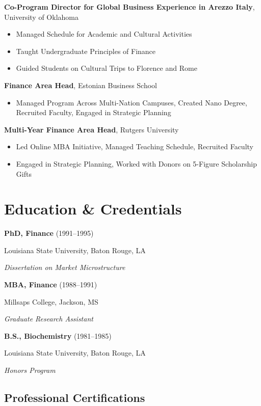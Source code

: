 \documentclass[11pt,a4paper,]{awesome-cv}
\let\oldtextbf\textbf
\renewcommand{\textbf}[1]{\oldtextbf{#1}\vspace{-1mm}}
\begin{document}
\textbf{Co-Program Director for Global Business Experience in Arezzo Italy},
University of Oklahoma

\begin{itemize}
\item Managed Schedule for Academic and Cultural Activities
\item Taught Undergraduate Principles of Finance
\item Guided Students on Cultural Trips to Florence and Rome
\end{itemize}

\textbf{Finance Area Head}, Estonian Business School

\begin{itemize}
\item Managed Program Across Multi-Nation Campuses, Created Nano Degree, Recruited Faculty, Engaged in Strategic Planning
\end{itemize}

\textbf{Multi-Year Finance Area Head}, Rutgers University

\begin{itemize}
\item Led Online MBA Initiative, Managed Teaching Schedule, Recruited Faculty
\item Engaged in Strategic Planning, Worked with Donors on 5-Figure Scholarship Gifts
\end{itemize}

\section{Education \& Credentials}\label{education-credentials}

\textbf{PhD, Finance} (1991--1995)

Louisiana State University, Baton Rouge, LA

\textit{Dissertation on Market Microstructure}

\textbf{MBA, Finance} (1988--1991)

Millsaps College, Jackson, MS

\textit{Graduate Research Assistant}

\textbf{B.S., Biochemistry} (1981--1985)

Louisiana State University, Baton Rouge, LA

\textit{Honors Program}

\subsection{Professional Certifications}
\end{document}
